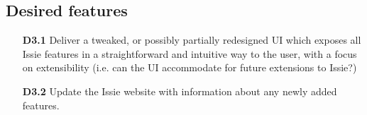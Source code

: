 \subsection*{Desired features}
\begin{itemize}
    \item[\textbf{D3.1}] Deliver a tweaked, or possibly partially redesigned UI which exposes all Issie features in a straightforward and intuitive way to the user, with a focus on extensibility (i.e. can the UI accommodate for future extensions to Issie?)
    \medskip
    \item[\textbf{D3.2}] Update the Issie website with information about any newly added features.
\end{itemize}
